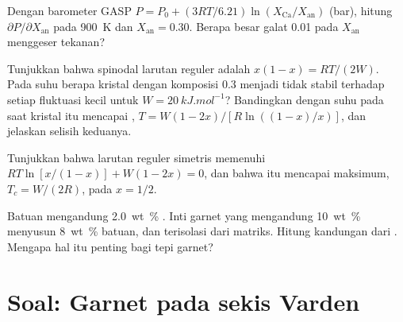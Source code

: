 \begin{exercise}[$\star\star$]\label{exo:b3:petrological-thermodynamics:9}
Dengan barometer GASP $P = P_0 + (3RT/6.21)\ln(X_{\text{Ca}}/X_{\text{an}})$
(bar), hitung $\partial P/\partial X_{\text{an}}$ pada \qty{900}{K} dan
$X_{\text{an}} = 0.30$. Berapa besar galat 0.01 pada $X_{\text{an}}$
menggeser tekanan?
\end{exercise}

\begin{exercise}[$\star\star\star$]\label{exo:b3:petrological-thermodynamics:10}
Tunjukkan bahwa spinodal larutan reguler adalah $x(1 - x) = RT/(2W)$. Pada suhu berapa
kristal dengan komposisi 0.3 menjadi tidak stabil terhadap setiap fluktuasi kecil
untuk $W = \qty{20}{kJ.mol^{-1}}$? Bandingkan dengan suhu pada saat
kristal itu mencapai , $T = W(1 - 2x)/[R\ln((1 - x)/x)]$, dan jelaskan
selisih keduanya.
\end{exercise}

\begin{exercise}[$\star\star\star$]\label{exo:b3:petrological-thermodynamics:11}
Tunjukkan bahwa  larutan reguler simetris memenuhi $RT\ln[x/(1 -
x)] + W(1 - 2x) = 0$, dan bahwa  itu mencapai maksimum, $T_c = W/(2R)$, pada $x
= 1/2$.
\end{exercise}

\begin{exercise}[$\star\star\star$]\label{exo:b3:petrological-thermodynamics:12}
Batuan mengandung \qty{2.0}{wt\percent} . Inti garnet yang mengandung
\qty{10}{wt\percent}  menyusun \qty{8}{wt\percent} batuan, dan
terisolasi dari matriks. Hitung kandungan  dari . Mengapa hal itu penting bagi  tepi garnet?
\end{exercise}

\section{Soal: Garnet pada sekis Varden}

